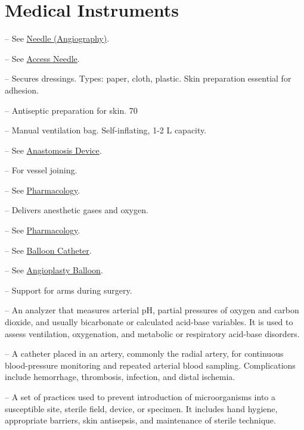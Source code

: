 \chapter{Medical Instruments}

-- See \hyperlink{Needle (Angiography)}{Needle (Angiography)}.

-- See \hyperlink{Access Needle}{Access Needle}.

-- Secures dressings. Types: paper, cloth, plastic. Skin preparation essential for adhesion.

-- Antiseptic preparation for skin. 70%

-- Manual ventilation bag. Self-inflating, 1-2 L capacity.

-- See \hyperlink{Anastomosis Device}{Anastomosis Device}.

-- For vessel joining.

-- See \hyperlink{Pharmacology}{Pharmacology}.

-- Delivers anesthetic gases and oxygen.

-- See \hyperlink{Pharmacology}{Pharmacology}.

-- See \hyperlink{Balloon Catheter}{Balloon Catheter}.

-- See \hyperlink{Angioplasty Balloon}{Angioplasty Balloon}.

-- Support for arms during surgery.

-- An analyzer that measures arterial pH, partial pressures of oxygen and carbon dioxide, and usually bicarbonate or calculated acid-base variables. It is used to assess ventilation, oxygenation, and metabolic or respiratory acid-base disorders.

-- A catheter placed in an artery, commonly the radial artery, for continuous blood-pressure monitoring and repeated arterial blood sampling. Complications include hemorrhage, thrombosis, infection, and distal ischemia.

-- A set of practices used to prevent introduction of microorganisms into a susceptible site, sterile field, device, or specimen. It includes hand hygiene, appropriate barriers, skin antisepsis, and maintenance of sterile technique.


